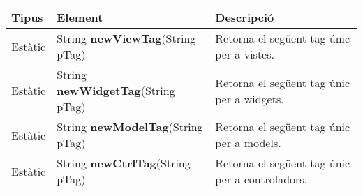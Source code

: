 \documentclass{article}
\begin{document}
\begin{table}[H]
\footnotesizes
\begin{tabular}{@{}L{1.25cm}L{4.5cm}L{8.75cm}@{}}
\toprule
\textbf{Tipus} & \textbf{Element} & \textbf{Descripció} \\
\midrule
Estàtic & String \textbf{newViewTag}(String pTag) & Retorna el següent tag únic per a vistes. \\
Estàtic & String \textbf{newWidgetTag}(String pTag) & Retorna el següent tag únic per a widgets. \\
Estàtic & String \textbf{newModelTag}(String pTag) & Retorna el següent tag únic per a models. \\
Estàtic & String \textbf{newCtrlTag}(String pTag) & Retorna el següent tag únic per a controladors. \\
\bottomrule
\end{tabular}
\end{table}
\end{document}
